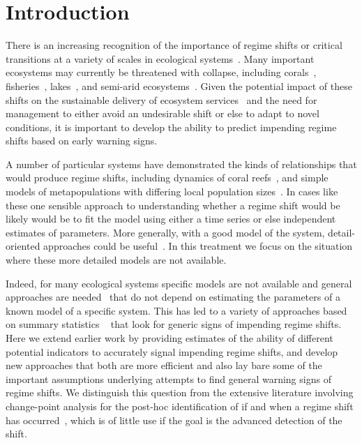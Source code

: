 \documentclass[authoryear,review,11pt]{elsarticle}
\begin{document}
\section{Introduction}
There is an increasing recognition of the importance of regime shifts or critical transitions at a variety of scales in ecological systems~\citep{Holling1973, Wissel1984, Scheffer2001, Scheffer2009, Drake2010, Carpenter2011}⁠.
Many important ecosystems may currently be threatened with collapse, including corals~\citep{Bellwood2004}, fisheries~\citep{Berkes2006}⁠, lakes~\citep{Carpenter2011}, and semi-arid ecosystems~\citep{Kefi2007}⁠.
Given the potential impact of  these shifts on the sustainable delivery of ecosystem services~\citep{Folke2004}
and the need for management to either avoid an undesirable shift or else to adapt to novel conditions,
it is important to develop the ability to predict impending regime shifts based on early warning signs.


A number of particular systems have demonstrated the kinds of relationships that would produce regime shifts,
including dynamics of coral reefs~\citep{Mumby2007},
and simple models of metapopulations with differing local population sizes~\citep{Hastings1991a}.
In cases like these one sensible approach to understanding 
whether a regime shift would be likely would be 
to fit the model using either a time series or else independent estimates of parameters. 
More generally, with a good model of the system, detail-oriented approaches could be useful~\citep{Lade2012}.  
In this treatment we focus on the situation where these more detailed models are not available.  

Indeed, for many ecological systems specific models are not available and general approaches are needed~\citep{Scheffer2009, Lade2012}
that do not depend on estimating the parameters of a known model of a specific system. 
This has led to a variety of approaches based on summary statistics
~\citep[\emph{e.g.}][]{Carpenter2006, Held2004, Dakos2008, Guttal2008, Biggs2009, Carpenter2011, Seekell2011}
that look for generic signs of impending regime shifts.  
Here we extend earlier work by providing estimates 
of the ability of different potential indicators to accurately signal impending regime shifts,
and develop new approaches that both are more efficient
and also lay bare some of the important assumptions underlying attempts 
to find general warning signs of regime shifts.  
We distinguish this question from the extensive literature involving change-point analysis 
for the post-hoc identification of if and when a regime shift has occurred~\citep{Easterling1995, Rodionov2004, Lenton2009}, 
which is of little use if the goal is the advanced detection of the shift.  
\end{document}
